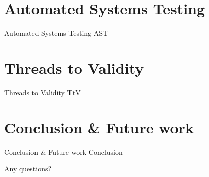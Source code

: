 \section{Automated Systems Testing}
	\begin{frame}{Automated Systems Testing}
		AST
	\end{frame}

\section{Threads to Validity}
	\begin{frame}{Threads to Validity}
		TtV
	\end{frame}

\section{Conclusion \& Future work}
	\begin{frame}{Conclusion \& Future work}
		Conclusion
	\end{frame}

\begin{frame}[standout]

	{\Large Any questions?}

\end{frame}





